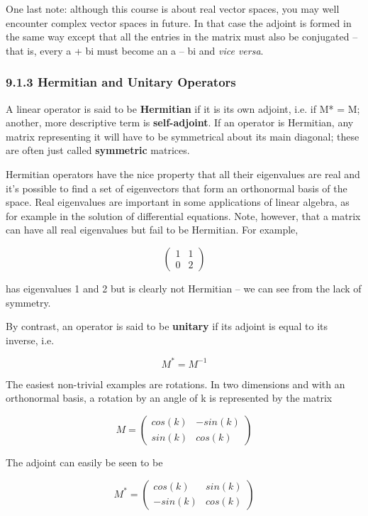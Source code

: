 \documentclass[oneside,english]{amsbook}
\numberwithin{section}{chapter}
\theoremstyle{plain}
\theoremstyle{definition}
\begin{document}
One last note: although this course is about real vector spaces, you may
well encounter complex vector spaces in future. In that case the adjoint
is formed in the same way except that all the entries in the matrix must
also be conjugated -- that is, every a + bi must become an a -- bi and
\emph{vice versa}.

\subsubsection{9.1.3 Hermitian and Unitary
	Operators}\label{hermitian-and-unitary-operators}

A linear operator is said to be \textbf{Hermitian} if it is its own
adjoint, i.e. if M* = M; another, more descriptive term is
\textbf{self-adjoint}. If an operator is Hermitian, any matrix
representing it will have to be symmetrical about its main diagonal;
these are often just called \textbf{symmetric} matrices.

Hermitian operators have the nice property that all their eigenvalues
are real and it's possible to find a set of eigenvectors that form an
orthonormal basis of the space. Real eigenvalues are important in some
applications of linear algebra, as for example in the solution of
differential equations. Note, however, that a matrix can have all real
eigenvalues but fail to be Hermitian. For example,

\[\begin{pmatrix}
	1 & 1 \\
	0 & 2
\end{pmatrix}\]

has eigenvalues 1 and 2 but is clearly not Hermitian -- we can see from
the lack of symmetry.

By contrast, an operator is said to be \textbf{unitary} if its adjoint
is equal to its inverse, i.e.

\[M^{*} = M^{- 1}\]

The easiest non-trivial examples are rotations. In two dimensions and
with an orthonormal basis, a rotation by an angle of k is represented by
the matrix

\[M = \begin{pmatrix}
	cos(k) & - sin(k) \\
	sin(k) & cos(k)
\end{pmatrix}\]

The adjoint can easily be seen to be

\[M^{*} = \begin{pmatrix}
	cos(k) & sin(k) \\
	- sin(k) & cos(k)
\end{pmatrix}\]
\end{document}
